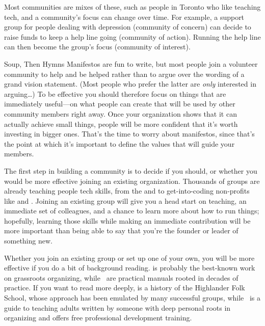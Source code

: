 Most communities are mixes of these,
such as people in Toronto who like teaching tech,
and a community's focus can change over time.
For example,
a support group for people dealing with depression (community of concern)
can decide to raise funds to keep a help line going (community of action).
Running the help line can then become the group's focus (community of interest).

\begin{aside}{Soup, Then Hymns}
  Manifestos are fun to write,
  but most people join a volunteer community to help and be helped
  rather than to argue over the wording of a grand vision statement.
  (Most people who prefer the latter are \emph{only} interested in arguing{\ldots})
  To be effective you should therefore focus on things that are immediately useful---on
  what people can create that will be used by other community members right away.
  Once your organization shows that it can actually achieve small things,
  people will be more confident that it's worth investing in bigger ones.
  That's the time to worry about manifestos,
  since that's   the point at which it's important to define the values
  that will guide your members.
\end{aside}


The first step in building a community is to decide if you should,
or whether you would be more effective joining an existing organization.
Thousands of groups are already teaching people tech skills,
from the 
and 
to get-into-coding non-profits like
and .
Joining an existing group will give you a head start on teaching,
an immediate set of colleagues,
and a chance to learn more about how to run things;
hopefully,
learning those skills while making an immediate contribution
will be more important than being able to say that
you're the founder or leader of something new.

Whether you join an existing group or set up one of your own,
you will be more effective if you do a bit of background reading.
\cite{Alin1989,Lake2018} is probably the best-known work on grassroots organizing,
while~\cite{Brow2007,Midw2010,Lake2018} are practical manuals rooted in decades of practice.
If you want to read more deeply,
\cite{Adam1975} is a history of the Highlander Folk School,
whose approach has been emulated by many successful groups,
while~\cite{Spal2014} is a guide to teaching adults
written by someone with deep personal roots in organizing
and 
offers free professional development training.


